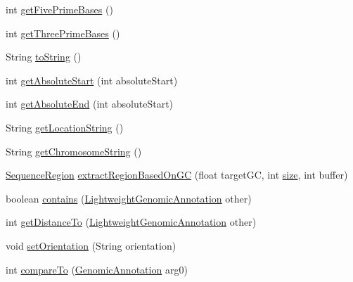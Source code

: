 \begin{DoxyCompactItemize}
\item 
int \hyperlink{classbroad_1_1core_1_1sequence_1_1_sequence_region_ad170cee390bc0e30111801aea4ea5522}{get\+Five\+Prime\+Bases} ()
\item 
int \hyperlink{classbroad_1_1core_1_1sequence_1_1_sequence_region_af89ecd9fdc8acb1252e1366c4297d550}{get\+Three\+Prime\+Bases} ()
\item 
String \hyperlink{classbroad_1_1core_1_1sequence_1_1_sequence_region_a136bc4a74e8f079cc37f9449025f2788}{to\+String} ()
\item 
int \hyperlink{classbroad_1_1core_1_1sequence_1_1_sequence_region_a856ad86d2f8a2bd5ccd5199ab7773518}{get\+Absolute\+Start} (int absolute\+Start)
\item 
int \hyperlink{classbroad_1_1core_1_1sequence_1_1_sequence_region_a0dc2e7da9f2c51472a0e3eac713f832d}{get\+Absolute\+End} (int absolute\+Start)
\item 
String \hyperlink{classbroad_1_1core_1_1sequence_1_1_sequence_region_ab928ab467224a7fba4e8cc1585befd1f}{get\+Location\+String} ()
\item 
String \hyperlink{classbroad_1_1core_1_1sequence_1_1_sequence_region_a7ff291e7f7540b7707f500210ad50803}{get\+Chromosome\+String} ()
\item 
\hyperlink{classbroad_1_1core_1_1sequence_1_1_sequence_region}{Sequence\+Region} \hyperlink{classbroad_1_1core_1_1sequence_1_1_sequence_region_ab1162fe9b4986ad0df49b2381a90d6b9}{extract\+Region\+Based\+On\+G\+C} (float target\+G\+C, int \hyperlink{classbroad_1_1core_1_1sequence_1_1_sequence_region_aa3ee74c7111be122e85a67df4fc44acb}{size}, int buffer)
\item 
boolean \hyperlink{classbroad_1_1core_1_1sequence_1_1_sequence_region_ae868161096afd01404857de70c867db6}{contains} (\hyperlink{interfacebroad_1_1core_1_1annotation_1_1_lightweight_genomic_annotation}{Lightweight\+Genomic\+Annotation} other)
\item 
int \hyperlink{classbroad_1_1core_1_1sequence_1_1_sequence_region_a53a14391b4e8c69c4f13e7428f158d70}{get\+Distance\+To} (\hyperlink{interfacebroad_1_1core_1_1annotation_1_1_lightweight_genomic_annotation}{Lightweight\+Genomic\+Annotation} other)
\item 
void \hyperlink{classbroad_1_1core_1_1sequence_1_1_sequence_region_a202b0129ab97723c01d90963f2040a98}{set\+Orientation} (String orientation)
\item 
int \hyperlink{classbroad_1_1core_1_1sequence_1_1_sequence_region_ab5b37e429308cc060e9a3e1933c22592}{compare\+To} (\hyperlink{interfacebroad_1_1core_1_1annotation_1_1_genomic_annotation}{Genomic\+Annotation} arg0)

\end{DoxyCompactItemize}
